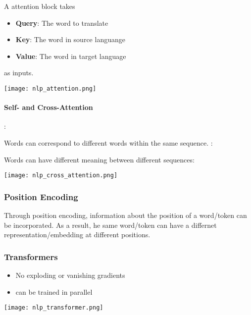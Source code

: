 \newpar{}
A attention block takes
\begin{itemize}
    \item \textbf{Query}: The word to translate
    \item \textbf{Key}: The word in source languange
    \item \textbf{Value}: The word in target language
\end{itemize}
as inputs.

\newpar{}
\begin{center}
    \texttt{[image: nlp\_attention.png]}
\end{center}

\paragraph{Self- and Cross-Attention}

:

Words can correspond to different words within the same sequence.
\newpar{}
:

Words can have different meaning between different sequences:

\begin{center}
    \texttt{[image: nlp\_cross\_attention.png]}
\end{center}

\subsubsection{Position Encoding}
Through position encoding, information about the position of a word/token can be incorporated. As a result, he same word/token can have a differnet representation/embedding at different positions.

\subsubsection{Transformers}
\begin{itemize}
    \item No exploding or vanishing gradients
    \item can be trained in parallel
\end{itemize}
\begin{center}
    \texttt{[image: nlp\_transformer.png]}
\end{center}


